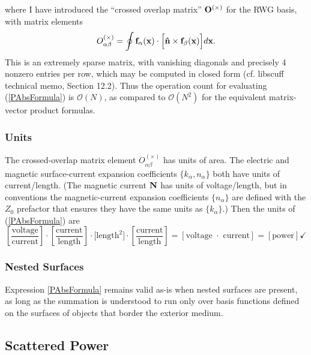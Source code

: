 \documentclass[letterpaper]{article}
\begin{document}
where I have introduced the ``crossed overlap matrix'' $\mathbf{O}^{(\times)}$
for the RWG basis, with matrix elements 
\begin{align*}
O^{(\times)}_{\alpha\beta}
=\oint \mathbf{f}_\alpha(\mathbf{x}) \cdot 
       \Big[\mathbf{\hat n} \times \mathbf{f}_\beta(\mathbf{x}) \Big]
       d\mathbf{x}.
\end{align*}
This is an extremely 
sparse matrix, with vanishing diagonals and precisely 4 nonzero 
entries per row, which may be computed in
closed form (cf. {\sc libscuff} technical memo, Section 12.2).
Thus the operation count for evaluating (\ref{PAbsFormula}) 
is $\mathcal{O}(N)$, as compared to $\mathcal{O}(N^2)$ for 
the equivalent matrix-vector product formulas.

\subsubsection*{Units}
The crossed-overlap matrix element $O^{(\times)}_{\alpha\beta}$ has
units of area.
The electric and magnetic surface-current expansion coefficients
$\{k_\alpha, n_\alpha\}$ both have units of current/length.
(The magnetic current $\mathbf{N}$ has units of voltage/length, 
but in \lss conventions the magnetic-current expansion 
coefficients $\{n_\alpha\}$ are defined with the $Z_0$ 
prefactor that ensures they have the same units as $\{k_\alpha\}$.)
Then the units of (\ref{PAbsFormula}) are 
$$ \left[\frac{\text{voltage}}{\text{current}}\right]
   \cdot
   \left[\frac{\text{current}}{\text{length}}\right]
   \cdot
   \Big[\text{length}^2\Big]
   \cdot
   \left[\frac{\text{current}}{\text{length}}\right]
  =\left[\text{voltage }\cdot\text{ current}\right] 
  =\left[\text{power}\right] \checkmark
$$

\subsubsection*{Nested Surfaces}

Expression \ref{PAbsFormula} remains valid as-is when nested
surfaces are present, as long as the summation is understood
to run only over basis functions defined on the surfaces of 
objects that border the exterior medium.

\subsection{Scattered Power}
\end{document}
